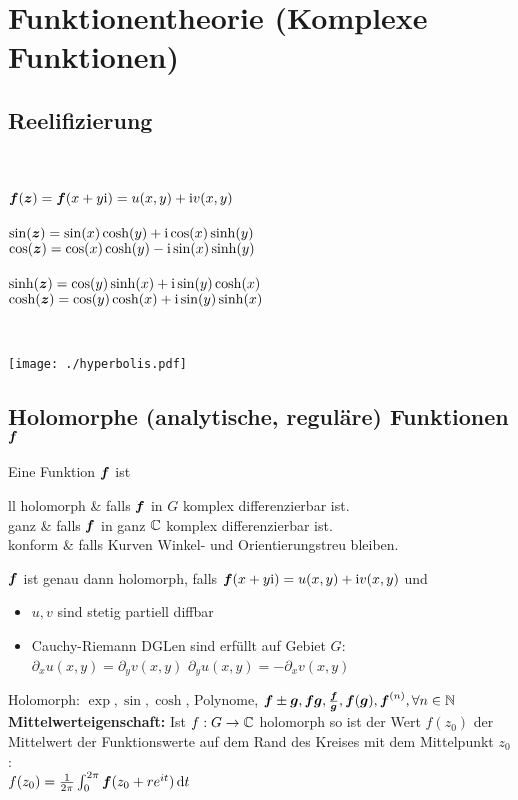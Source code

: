 \documentclass[german,color,5pt]{latex4ei/latex4ei_fs}
\begin{document}
\section{Funktionentheorie (Komplexe Funktionen)}
\begin{sectionbox}
	\parbox{4.7cm}{
		\subsection{Reelifizierung}
		\ \\ \ \\
		$\boldsymbol{f}(\boldsymbol{z}) = \boldsymbol{f}(x+y \mathrm{i}) = u(x,y) + \mathrm{i} v(x,y)$\\
		\\
		$\sin(\boldsymbol{z}) = \sin(x)\cosh(y) + \mathrm{i} \cos(x)\sinh(y)$\\
		$\cos(\boldsymbol{z}) = \cos(x)\cosh(y) - \mathrm{i} \sin(x)\sinh(y)$\\
		\\
		$\sinh(\boldsymbol{z}) = \cos(y) \sinh(x) + \mathrm{i} \sin(y) \cosh(x)$\\
		$\cosh(\boldsymbol{z}) = \cos(y) \cosh(x) + \mathrm{i} \sin(y) \sinh(x)$ }\ 
	\parbox{2cm}{\texttt{[image: ./hyperbolis.pdf]} }
\end{sectionbox}

\begin{sectionbox}
	\subsection{Holomorphe (analytische, reguläre) Funktionen $\boldsymbol{f}$}
	Eine Funktion $\boldsymbol{f}$ ist
	\begin{tablebox}{ll}
		holomorph & falls $\boldsymbol{f}$ in $G$ komplex differenzierbar ist.\\
		ganz & falls $\boldsymbol{f}$ in ganz $\mathbb C$ komplex differenzierbar ist.\\
		konform & falls Kurven Winkel- und Orientierungstreu bleiben.\\

	\end{tablebox}
	$\boldsymbol{f}$ ist genau dann holomorph, falls $\boldsymbol{f}(x+y\mathrm{i}) = u(x,y) + \mathrm{i} v(x,y)$ und
	\begin{itemize}\itemsep0pt
		\item $u,v$ sind stetig partiell diffbar
		\item Cauchy-Riemann DGLen sind erfüllt auf Gebiet $G$:\\
		$\partial_x u(x,y) = \partial_y v(x,y)$ \qquad $\partial_y u(x,y) = - \partial_x v(x,y)$
	\end{itemize}
	Holomorph: $\exp, \sin, \cosh$, Polynome, $\boldsymbol{f}\pm \boldsymbol{g}, \boldsymbol{f} \boldsymbol{g}, \frac{\boldsymbol{f}}{\boldsymbol{g}}, \boldsymbol{f}(\boldsymbol{g}),\boldsymbol{f}^{(n)}, \forall n\in \mathbb{N}$ \\
	\textbf{Mittelwerteigenschaft:} Ist $f:G\rightarrow \mathbb C$ holomorph so ist der Wert $f(z_0)$ der Mittelwert der Funktionswerte auf dem Rand des Kreises mit dem Mittelpunkt $z_0$: \\
	$f(z_0)=\frac{1}{2\pi}\int_{0}^{2\pi}\cx f(z_0+r e^{it})\diff t$
\end{sectionbox}
\end{document}
